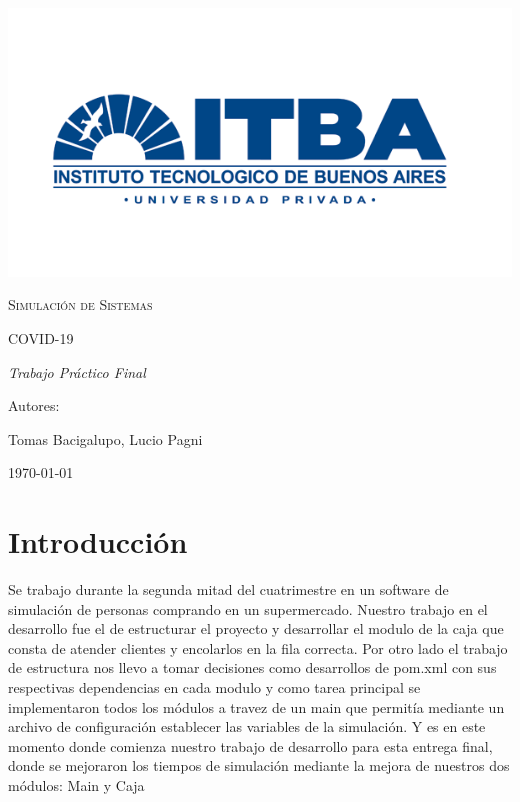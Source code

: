 \documentclass{article}
\author{Tomás Bacigalupo , Lucio Pagni}
\date{\today}
\author{Tomas Bacigalupo y Lucio Pagni}
\date{18/07/2020} %
\begin{document}
\begin{titlepage}
\centering
{\includegraphics[width=1\textwidth]{./images/logoitba.png}\par}
\vspace{1cm}
{\scshape\Large Simulaci\'on de Sistemas \par}
\vspace{3cm}
{\scshape\Huge COVID-19\par}
\vspace{3cm}
{\itshape\Large Trabajo Pr\'actico Final \par}
\vfill
{\Large Autores: \par}
{\Large Tomas Bacigalupo, Lucio Pagni\par}
\vfill
{\Large \today \par}
\end{titlepage}
\clearpage

\listoffigures   %
\clearpage
\listoftables %
 \clearpage

\tableofcontents
\clearpage

\section{Introducción}
Se trabajo durante la segunda mitad del cuatrimestre en un software de simulación de personas comprando en un supermercado. Nuestro trabajo en el desarrollo fue el de estructurar el proyecto y desarrollar el modulo de la caja que consta de atender clientes y encolarlos en la fila correcta. Por otro lado el trabajo de estructura nos llevo a tomar decisiones como desarrollos de pom.xml con sus respectivas dependencias en cada modulo y como tarea principal se implementaron todos los módulos a travez de un main que permitía mediante un archivo de configuración establecer las variables de la simulación. Y es en este momento donde comienza nuestro trabajo de desarrollo para esta entrega final, donde se mejoraron los tiempos de simulación mediante la mejora de nuestros dos módulos: Main y Caja
\end{document}
